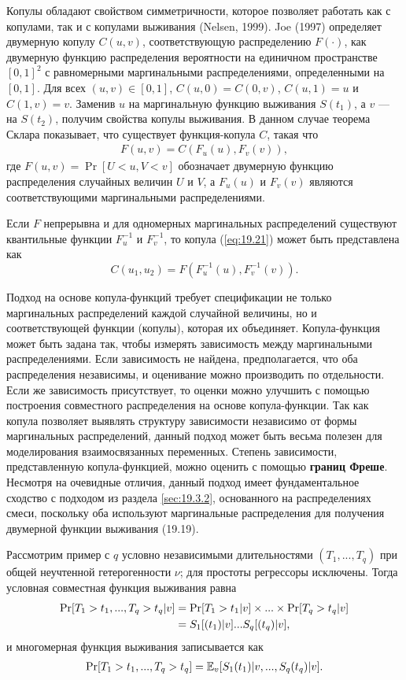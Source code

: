 Копулы обладают свойством симметричности, которое позволяет работать как с копулами, так и с копулами выживания (Nelsen, 1999). Joe (1997) определяет двумерную копулу $C(u, v)$, соответствующую распределению $F(\cdot)$, как двумерную функцию распределения вероятности на единичном пространстве $[0, 1]^2$ с равномерными маргинальными распределениями, определенными на $[0, 1]$. Для всех $(u, v) \in [0, 1]$, $C(u, 0) = C(0, v)$, $C(u, 1) = u$ и $C(1,v) = v$. Заменив $u$ на маргинальную функцию выживания $S(t_1)$, а $v$ --- на $S(t_2)$, получим свойства копулы выживания. В данном случае теорема Склара показывает, что существует функция-копула $C$, такая что
    \begin{align}\label{eq:19.21}
    F(u,v) = C(F_u(u), F_v(v)),
    \end{align}
где $F(u, v) = \Pr[U < u, V < v]$ обозначает двумерную функцию распределения случайных величин $U$ и $V$, а $F_u(u)$ и $F_v(v)$ являются соответствующими маргинальными распределениями.

Если $F$ непрерывна и для одномерных маргинальных распределений существуют квантильные функции $F_{u}^{-1}$ и $F_{v}^{-1}$, то копула (\ref{eq:19.21}) может быть представлена как
    $$C(u_1,u_2) = F(F^{-1}_u(u), F^{-1}_v(v)).$$

Подход на основе копула-функций требует спецификации не только маргинальных распределений каждой случайной величины, но и соответствующей функции (копулы), которая их объединяет. Копула-функция может быть задана так, чтобы измерять зависимость между маргинальными распределениями. Если зависимость не найдена, предполагается, что оба распределения независимы, и оценивание можно производить по отдельности. Если же зависимость присутствует, то оценки можно улучшить с помощью построения совместного распределения на основе копула-функции. Так как копула позволяет выявлять структуру зависимости независимо от формы маргинальных распределений, данный подход может быть весьма полезен для моделирования взаимосвязанных переменных. Степень зависимости, представленную копула-функцией, можно оценить с помощью \textbf{границ Фреше}. Несмотря на очевидные отличия, данный подход имеет фундаментальное сходство с подходом из раздела \ref{sec:19.3.2}, основанного на распределениях смеси, поскольку оба используют маргинальные распределения для получения двумерной функции выживания (19.19).

Рассмотрим пример с $q$ условно независимыми длительностями $(T_1, ..., T_q)$ при общей неучтенной гетерогенности $\nu$; для простоты регрессоры исключены. Тогда условная совместная функция выживания равна
    \begin{align}
    \Pr[T_1>t_1, ... , T_q>t_q|v]   &= \Pr[T_1>t_1|v] \times ... \times \Pr[T_q>t_q|v] \notag \\
                                    &= S_1[(t_1)|v]...S_q[(t_q)|v], \notag
    \end{align}
и многомерная функция выживания записывается как
    \begin{align}\label{eq:19.22}
    \Pr[T_1>t_1, ... , T_q>t_q] = \E_v[S_1(t_1)|v, ... , S_q(t_q)|v].
    \end{align}


